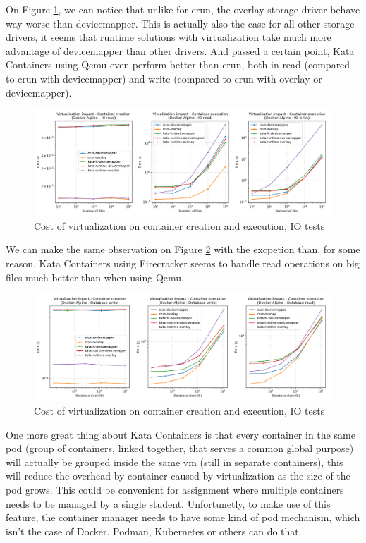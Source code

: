 On Figure \ref{fig:q3:virtualization:io}, we can notice that unlike for crun, the overlay storage driver behave way worse than devicemapper.  This is actually also the case for all other storage drivers, it seems that runtime solutions with virtualization take much more advantage of devicemapper than other drivers.  And passed a certain point, Kata Containers using Qemu even perform better than crun, both in read (compared to crun with devicemapper) and write (compared to crun with overlay or devicemapper).

\begin{figure}[h!]
  \begin{center}
    \includegraphics[width=\linewidth]{images/question-3-virtualization-io.png}
    \caption{Cost of virtualization on container creation and execution, IO tests}
    \label{fig:q3:virtualization:io}
  \end{center}
\end{figure}

We can make the same observation on Figure \ref{fig:q3:virtualization:db} with the excpetion than, for some reason, Kata Containers using Firecracker seems to handle read operations on big files much better than when using Qemu.

\begin{figure}[h!]
  \begin{center}
    \includegraphics[width=\linewidth]{images/question-3-virtualization-db.png}
    \caption{Cost of virtualization on container creation and execution, IO tests}
    \label{fig:q3:virtualization:db}
  \end{center}
\end{figure}

One more great thing about Kata Containers is that every container in the same pod (group of containers, linked together, that serves a common global purpose) will actually be grouped inside the same vm (still in separate containers), this will reduce the overhead by container caused by virtualization as the size of the pod grows.  This could be convenient for assignment where multiple containers needs to be managed by a single student.  Unfortunetly, to make use of this feature, the container manager needs to have some kind of pod mechanism, which isn't the case of Docker.  Podman, Kubernetes or others can do that.
